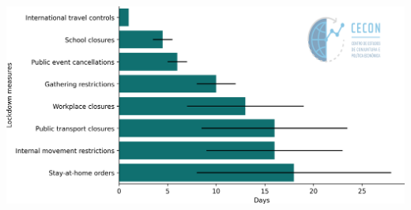 \documentclass{SelfArx}
\begin{document}
\begin{center}
\includegraphics[width=.9\linewidth]{./figs/IMF/Lock_measures.png}
\end{center}
\end{document}
